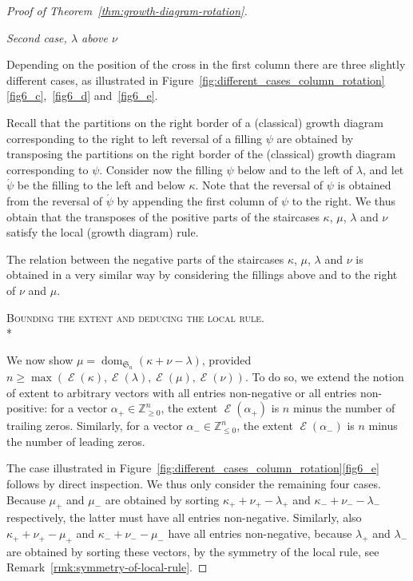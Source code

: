\documentclass[10pt]{article}
\theoremstyle{definition}
\newenvironment{enonce*}[2][]{\par\medskip\noindent\textbf{#2.}\itshape}{\par\medskip}
\newcommand{\fS}{\mathfrak{S}}
\newcommand{\ZZ}{\mathbb{Z}}
\DeclareMathOperator{\dom}{dom} %
\DeclareMathOperator{\extent}{\mathcal{E}} %
\newcommand{\half}[1]{\acute{#1}} %
\newcommand{\pos}[1]{#1_+} %
\renewcommand{\neg}[1]{#1_-} %
\begin{document}
\begin{proof}[Proof of Theorem~\ref{thm:growth-diagram-rotation}]
\begin{enonce*}[remark]{\emph{Second case, $\lambda$ above $\nu$}}\ 

 Depending on the position of the cross in the first column there
 are three slightly different cases, as illustrated in
 Figure~\ref{fig:different_cases_column_rotation}\ref{fig6_c},~\ref{fig6_d} and~\ref{fig6_e}.

 Recall that the partitions on the right border of a (classical)
 growth diagram corresponding to the right to left reversal of a
 filling $\psi$ are obtained by transposing the partitions on the
 right border of the (classical) growth diagram corresponding to
 $\psi$. Consider now the filling $\psi$ below and to the left of
 $\lambda$, and let $\half\psi$ be the filling to the left and below
 $\kappa$. Note that the reversal of $\psi$ is obtained from the
 reversal of $\half\psi$ by appending the first column of $\psi$ to
 the right. We thus obtain that the transposes of the positive
 parts of the staircases $\kappa$, $\mu$, $\lambda$ and $\nu$
 satisfy the local (growth diagram) rule.

 The relation between the negative parts of the staircases $\kappa$,
 $\mu$, $\lambda$ and $\nu$ is obtained in a very similar way by
 considering the fillings above and to the right of $\nu$ and $\mu$.
\end{enonce*}

\noindent
\textsc{Bounding the extent and deducing the local rule.}\\*\vspace*{-1.1em}

 We now show
 $\mu = \dom_{\fS_n}(\kappa+\nu-\lambda)$, provided
 $n\geq\max(\extent(\kappa),\extent(\lambda),\extent(\mu),\extent(\nu))$.
 To do so, we extend the notion of extent to arbitrary vectors with
 all entries non-negative or all entries non-positive: for a vector
 $\pos\alpha\in\ZZ_{\geq0}^n$, the extent $\extent(\pos\alpha)$ is
 $n$ minus the number of trailing zeros. Similarly, for a vector
 $\neg\alpha\in\ZZ_{\leq0}^n$, the extent $\extent(\neg\alpha)$ is
 $n$ minus the number of leading zeros.

 The case illustrated in
 Figure~\ref{fig:different_cases_column_rotation}\ref{fig6_e} follows by
 direct inspection. We thus only consider the remaining four cases.
 Because $\pos\mu$ and $\neg\mu$ are obtained by sorting
 $\pos\kappa+\pos\nu-\pos\lambda$ and
 $\neg\kappa+\neg\nu-\neg\lambda$ respectively, the latter must have
 all entries non-negative. Similarly, also
 $\pos\kappa+\pos\nu-\pos\mu$ and $\neg\kappa+\neg\nu-\neg\mu$ have
 all entries non-negative, because $\pos\lambda$ and $\neg\lambda$
 are obtained by sorting these vectors, by the symmetry of the local
 rule, see Remark~\ref{rmk:symmetry-of-local-rule}.


\end{proof}
\end{document}
